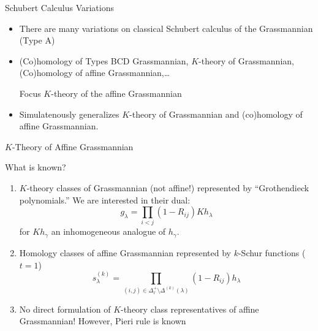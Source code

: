 \documentclass{beamer}
\begin{document}
\begin{frame}{Schubert Calculus Variations}
  \begin{itemize}
  \item There are many variations on classical Schubert calculus of the
  Grassmannian (Type A)\pause
  \item (Co)homology of Types BCD Grassmannian, \(K\)-theory of
    Grassmannian, (Co)homology of affine Grassmannian,\ldots \pause
  \begin{block}{Focus}
    \(K\)-theory of the affine Grassmannian \pause
  \end{block}
  \item Simulatenously generalizes \(K\)-theory of Grassmannian and
    (co)homology of affine Grassmannian.
  \end{itemize}
\end{frame}
\begin{frame}{\(K\)-Theory of Affine Grassmannian}
  \begin{block}{What is known?}
    \begin{enumerate}
    \item \(K\)-theory classes of Grassmannian (not affine!)
      represented by
      ``Grothendieck 
      polynomials.'' We are interested in their dual: \[
        g_\lambda = \prod_{i < j} (1-R_{ij}) Kh_\lambda
      \]
      for \(Kh_\gamma\) an inhomogeneous analogue of \(h_\gamma\).\pause
    \item Homology classes of affine Grassmannian represented by
      \(k\)-Schur functions (\(t=1\)) \[
        s_\lambda^{(k)} = \prod_{(i,j) \in \Delta^+_\ell \setminus
          \Delta^{(k)}(\lambda)} (1-R_{ij}) h_\lambda
        \] \pause
    \vspace{-0.2in}
    \item No direct formulation of \(K\)-theory class representatives of affine 
      Grassmannian! However, Pieri rule is known~\cite{lss}~\cite{morse}
    \end{enumerate}
  \end{block}
\end{frame}
\end{document}
